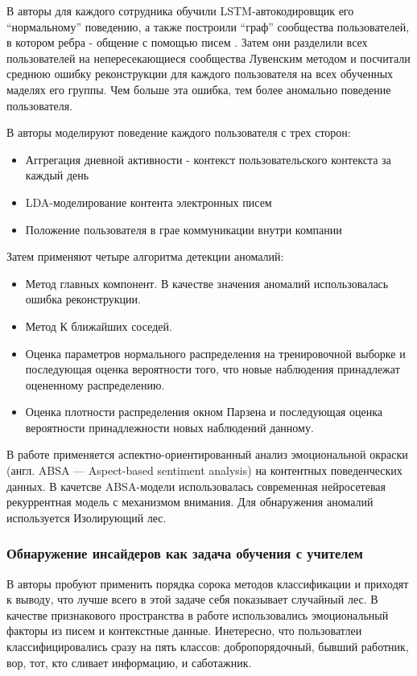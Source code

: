 В \cite{lac} авторы для каждого сотрудника обучили LSTM-автокодировщик его ``нормальному'' поведению, а также построили ``граф''  сообщества пользователей, в котором ребра - общение с помощью писем . Затем они разделили всех пользователей на непересекающиеся сообщества Лувенским методом\cite{louvain} и посчитали среднюю ошибку реконструкции для каждого пользователя на всех обученных маделях его группы. Чем больше эта ошибка, тем более аномально поведение пользователя.

В \cite{anomalyalgo} авторы моделируют поведение каждого пользователя с трех сторон:
\begin{itemize}
\item Аггрегация дневной активности - контекст пользовательского контекста за каждый день
\item LDA-моделирование контента электронных писем
\item Положение пользователя в грае коммуникации внутри компании
\end{itemize}
Затем применяют четыре алгоритма детекции аномалий:
\begin{itemize}
\item Метод главных компонент. В качестве значения аномалий использовалась ошибка реконструкции.
\item Метод К ближайших соседей.
\item Оценка параметров нормального распределения на тренировочной выборке и последующая оценка вероятности того, что новые наблюдения принадлежат оцененному распределению.
\item Оценка плотности распределения окном Парзена и последующая оценка вероятности принадлежности новых наблюдений данному.
\end{itemize}

В работе \cite{absa} применяется аспектно-ориентированный анализ эмоциональной окраски (англ. ABSA --- Aspect-based sentiment analysis) на контентных поведенческих данных. В качетсве ABSA-модели использовалась современная нейросетевая рекуррентная модель с механизмом внимания. Для обнаружения аномалий используется Изолирующий лес.

\subsubsection{Обнаружение инсайдеров как задача обучения с учителем}

В \cite{suites} авторы пробуют применить порядка сорока методов классификации и приходят к выводу, что лучше всего в этой задаче себя показывает случайный лес. В качестве признакового пространства в работе использовались эмоциональный факторы из писем и контекстные данные. Инетересно, что пользоватлеи классифицировались сразу на пять классов: добропорядочный, бывший работник, вор, тот, кто сливает информацию, и саботажник.

